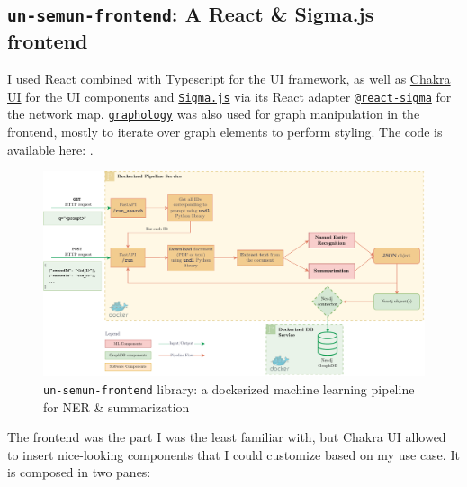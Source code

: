 
\subsection{\texttt{un-semun-frontend}: A React \& Sigma.js frontend} \label{ssec:un-semun-frontend-a-react-sigma-js-frontend}

I used React combined with Typescript for the UI framework, as well as \href{https://chakra-ui.com/}{Chakra UI} for the UI components and \href{https://www.sigmajs.org/}{\texttt{Sigma.js}} via its React adapter \href{https://sim51.github.io/react-sigma/}{\texttt{@react-sigma}} for the network map. \href{https://graphology.github.io/}{\texttt{graphology}} was also used for graph manipulation in the frontend, mostly to iterate over graph elements to perform styling. The code is available here: .




\begin{figure}[!htb]
    \centering

    \includegraphics[width=\textwidth]{res/ml-pipeline.pdf}
    \caption{\texttt{un-semun-frontend} library: a dockerized machine learning pipeline for NER \& summarization}

    \label{fig:frontend-screenshot}
\end{figure}


The frontend was the part I was the least familiar with, but Chakra UI allowed to insert nice-looking components that I could customize based on my use case. It is composed in two panes:


